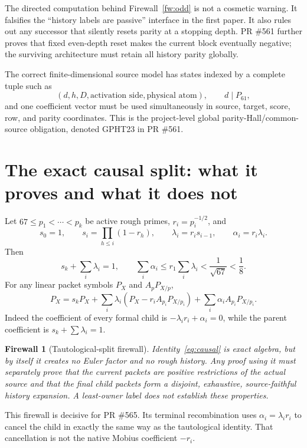 \documentclass[11pt]{article}
\newtheorem{firewall}[theorem]{Firewall}
\newcommand{\1}{\mathbf 1}
\begin{document}
The directed computation behind Firewall~\ref{fw:odd} is not a cosmetic warning.  It falsifies the ``history labels are passive'' interface in the first paper.  It also rules out any successor that silently resets parity at a stopping depth.  PR \#561 further proves that fixed even-depth reset makes the current block eventually negative; the surviving architecture must retain all history parity globally.

The correct finite-dimensional source model has states indexed by a complete tuple such as
\[
(d,h,D,\text{activation side},\text{physical atom}),
\qquad d\mid P_{61},
\]
and one coefficient vector must be used simultaneously in source, target, score, row, and parity coordinates.  This is the project-level global parity-Hall/common-source obligation, denoted GPHT23 in PR \#561.

\section{The exact causal split: what it proves and what it does not}

Let $67\le p_1<\cdots<p_k$ be active rough primes, $r_i=p_i^{-1/2}$, and
\[
s_0=1,\qquad s_i=\prod_{h\le i}(1-r_h),
\qquad \lambda_i=r_is_{i-1},
\qquad \alpha_i=r_i\lambda_i.
\]
Then
\[
s_k+\sum_i\lambda_i=1,
\qquad
\sum_i\alpha_i\le r_1\sum_i\lambda_i<\frac1{\sqrt{67}}<\frac18.
\]
For any linear packet symbols $P_X$ and $A_pP_{X/p}$,
\begin{equation}\label{eq:causal}
P_X=s_kP_X+\sum_i\lambda_i(P_X-r_iA_{p_i}P_{X/p_i})
+\sum_i\alpha_iA_{p_i}P_{X/p_i}.
\end{equation}
Indeed the coefficient of every formal child is $-\lambda_ir_i+\alpha_i=0$, while the parent coefficient is $s_k+\sum\lambda_i=1$.

\begin{firewall}[Tautological-split firewall]
Identity~\eqref{eq:causal} is exact algebra, but by itself it creates no Euler factor and no rough history.  Any proof using it must separately prove that the current packets are positive restrictions of the actual source and that the final child packets form a disjoint, exhaustive, source-faithful history expansion.  A least-owner label does not establish these properties.
\end{firewall}

This firewall is decisive for PR \#565.  Its terminal recombination uses $\alpha_i=\lambda_ir_i$ to cancel the child in exactly the same way as the tautological identity.  That cancellation is not the native Mobius coefficient $-r_i$.
\end{document}
